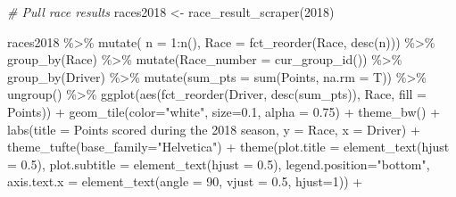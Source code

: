 \documentclass[
]{book}
\newenvironment{Shaded}{\begin{snugshade}}{\end{snugshade}}
\newcommand{\AttributeTok}[1]{\textcolor[rgb]{0.77,0.63,0.00}{#1}}
\newcommand{\CommentTok}[1]{\textcolor[rgb]{0.56,0.35,0.01}{\textit{#1}}}
\newcommand{\DecValTok}[1]{\textcolor[rgb]{0.00,0.00,0.81}{#1}}
\newcommand{\FloatTok}[1]{\textcolor[rgb]{0.00,0.00,0.81}{#1}}
\newcommand{\FunctionTok}[1]{\textcolor[rgb]{0.00,0.00,0.00}{#1}}
\newcommand{\NormalTok}[1]{#1}
\newcommand{\OtherTok}[1]{\textcolor[rgb]{0.56,0.35,0.01}{#1}}
\newcommand{\SpecialCharTok}[1]{\textcolor[rgb]{0.00,0.00,0.00}{#1}}
\newcommand{\StringTok}[1]{\textcolor[rgb]{0.31,0.60,0.02}{#1}}
\begin{document}
\begin{Shaded}
\begin{Highlighting}[]
\CommentTok{\# Pull race results}
\NormalTok{races2018 }\OtherTok{\textless{}{-}} \FunctionTok{race\_result\_scraper}\NormalTok{(}\DecValTok{2018}\NormalTok{)}

\NormalTok{races2018 }\SpecialCharTok{\%\textgreater{}\%}
  \FunctionTok{mutate}\NormalTok{( }\AttributeTok{n =} \DecValTok{1}\SpecialCharTok{:}\FunctionTok{n}\NormalTok{(),}
          \AttributeTok{Race =} \FunctionTok{fct\_reorder}\NormalTok{(Race, }\FunctionTok{desc}\NormalTok{(n))) }\SpecialCharTok{\%\textgreater{}\%}
  \FunctionTok{group\_by}\NormalTok{(Race) }\SpecialCharTok{\%\textgreater{}\%} 
  \FunctionTok{mutate}\NormalTok{(}\AttributeTok{Race\_number =} \FunctionTok{cur\_group\_id}\NormalTok{()) }\SpecialCharTok{\%\textgreater{}\%}
  \FunctionTok{group\_by}\NormalTok{(Driver) }\SpecialCharTok{\%\textgreater{}\%} 
  \FunctionTok{mutate}\NormalTok{(}\AttributeTok{sum\_pts =} \FunctionTok{sum}\NormalTok{(Points, }\AttributeTok{na.rm =}\NormalTok{ T)) }\SpecialCharTok{\%\textgreater{}\%}
  \FunctionTok{ungroup}\NormalTok{() }\SpecialCharTok{\%\textgreater{}\%} 
  \FunctionTok{ggplot}\NormalTok{(}\FunctionTok{aes}\NormalTok{(}\FunctionTok{fct\_reorder}\NormalTok{(Driver, }\FunctionTok{desc}\NormalTok{(sum\_pts)), Race, }\AttributeTok{fill =}\NormalTok{ Points)) }\SpecialCharTok{+}
  \FunctionTok{geom\_tile}\NormalTok{(}\AttributeTok{color=}\StringTok{"white"}\NormalTok{, }\AttributeTok{size=}\FloatTok{0.1}\NormalTok{, }\AttributeTok{alpha =} \FloatTok{0.75}\NormalTok{) }\SpecialCharTok{+}
  \FunctionTok{theme\_bw}\NormalTok{() }\SpecialCharTok{+}
  \FunctionTok{labs}\NormalTok{(}\AttributeTok{title =} \StringTok{\textquotesingle{}Points scored during the 2018 season\textquotesingle{}}\NormalTok{,}
       \AttributeTok{y =} \StringTok{\textquotesingle{}Race\textquotesingle{}}\NormalTok{,}
       \AttributeTok{x =} \StringTok{\textquotesingle{}Driver\textquotesingle{}}\NormalTok{) }\SpecialCharTok{+} 
  \FunctionTok{theme\_tufte}\NormalTok{(}\AttributeTok{base\_family=}\StringTok{"Helvetica"}\NormalTok{)  }\SpecialCharTok{+}
  \FunctionTok{theme}\NormalTok{(}\AttributeTok{plot.title =} \FunctionTok{element\_text}\NormalTok{(}\AttributeTok{hjust =} \FloatTok{0.5}\NormalTok{),}
        \AttributeTok{plot.subtitle =} \FunctionTok{element\_text}\NormalTok{(}\AttributeTok{hjust =} \FloatTok{0.5}\NormalTok{),}
        \AttributeTok{legend.position=}\StringTok{"bottom"}\NormalTok{,}
        \AttributeTok{axis.text.x =} \FunctionTok{element\_text}\NormalTok{(}\AttributeTok{angle =} \DecValTok{90}\NormalTok{, }\AttributeTok{vjust =} \FloatTok{0.5}\NormalTok{, }\AttributeTok{hjust=}\DecValTok{1}\NormalTok{)) }\SpecialCharTok{+}

\end{Highlighting}
\end{Shaded}
\end{document}
